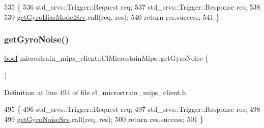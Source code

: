 \begin{DoxyCode}
535     \{
536         std\_srvs::Trigger::Request req;
537         std\_srvs::Trigger::Response res;
538 
539         \hyperlink{classmicrostrain__mips__client_1_1ClMicrostainMips_a63c964670a09edd036930cde7709e65e}{getGyroBiasModelSrv}.call(req, res);
540         \textcolor{keywordflow}{return} res.success;
541     \}
\end{DoxyCode}
\mbox{\label{classmicrostrain__mips__client_1_1ClMicrostainMips_a628a42bfa5c047e4a718a7e4c68422c3}} 
\subsubsection{\texorpdfstring{get\+Gyro\+Noise()}{getGyroNoise()}}
{\footnotesize\ttfamily \hyperlink{classbool}{bool} microstrain\+\_\+mips\+\_\+client\+::\+Cl\+Microstain\+Mips\+::get\+Gyro\+Noise (\begin{DoxyParamCaption}{ }\end{DoxyParamCaption})\hspace{0.3cm}{\ttfamily [inline]}}



Definition at line 494 of file cl\+\_\+microstrain\+\_\+mips\+\_\+client.\+h.


\begin{DoxyCode}
495     \{
496         std\_srvs::Trigger::Request req;
497         std\_srvs::Trigger::Response res;
498 
499         \hyperlink{classmicrostrain__mips__client_1_1ClMicrostainMips_a016edb8b282bd20158f0aafc2af0d4e0}{getGyroNoiseSrv}.call(req, res);
500         \textcolor{keywordflow}{return} res.success;
501     \}
\end{DoxyCode}
\mbox{\label{classmicrostrain__mips__client_1_1ClMicrostainMips_aad7874f7708db6915fb739c99f7e0701}} 
